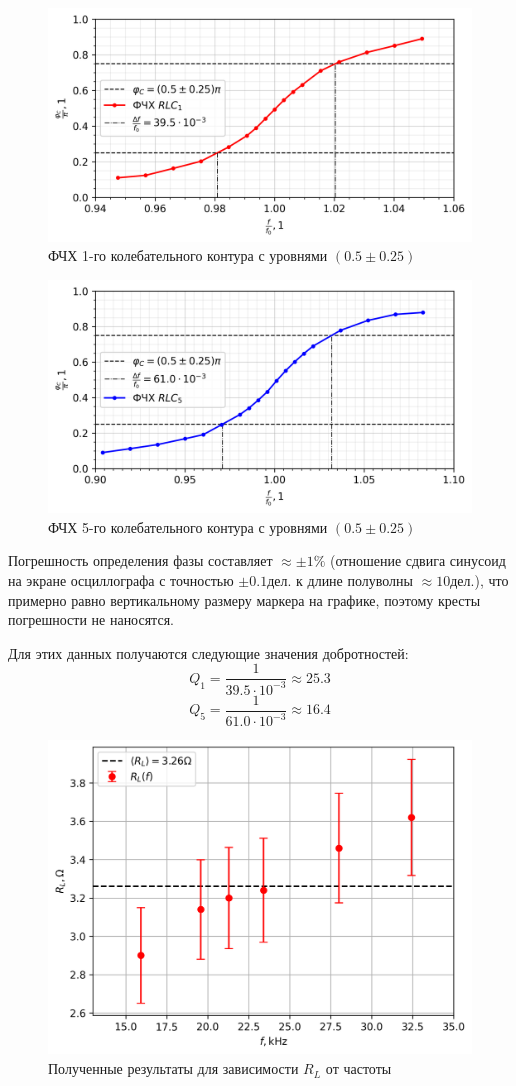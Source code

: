\documentclass[12pt, a4paper]{article}
\begin{document}
\begin{figure}[H]
  \includegraphics[width=0.8\linewidth]{pfc1.png}
  \caption{ФЧХ 1-го колебательного контура с уровнями $(0.5\pm0.25)$}
\end{figure}
\vspace{-5mm}
\begin{figure}[H]
  \includegraphics[width=0.8\linewidth]{pfc5.png}
  \caption{ФЧХ 5-го колебательного контура с уровнями $(0.5\pm0.25)$}
\end{figure}

Погрешность определения фазы составляет $\approx \pm 1\%$ (отношение сдвига синусоид на экране осциллографа с точностью $\pm 0.1 \text{дел.}$ к длине полуволны $\approx 10 \text{дел.}$), что примерно равно вертикальному размеру маркера на графике, поэтому кресты погрешности не наносятся.

Для этих данных получаются следующие значения добротностей:
$$Q_1 = \dfrac{1}{39.5\cdot 10^{-3}}\approx 25.3$$
$$Q_5 = \dfrac{1}{61.0\cdot 10^{-3}}\approx 16.4$$

\newpage
\begin{figure}[H]
  \centering
  \includegraphics[width = 0.8\linewidth]{rl.png}
  \caption{Полученные результаты для зависимости $R_L$ от частоты}
  \label{rl}
\end{figure}
\end{document}
